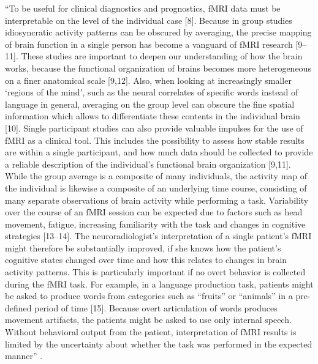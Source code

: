 ``To be useful for clinical diagnostics and prognostics, fMRI data must be
interpretable on the level of the individual case [8]. Because in group studies
idiosyncratic activity patterns can be obscured by averaging, the precise
mapping of brain function in a single person has become a vanguard of fMRI
research [9–11]. These studies are important to deepen our understanding of how
the brain works, because the functional organization of brains becomes more
heterogeneous on a finer anatomical scale [9,12]. Also, when looking at
increasingly smaller ‘regions of the mind’, such as the neural correlates of
specific words instead of language in general, averaging on the group level can
obscure the fine spatial information which allows to differentiate these
contents in the individual brain [10]. Single participant studies can also
provide valuable impulses for the use of fMRI as a clinical tool. This includes
the possibility to assess how stable results are within a single participant,
and how much data should be collected to provide a reliable description of the
individual’s functional brain organization [9,11]. While the group average is a
composite of many individuals, the activity map of the individual is likewise a
composite of an underlying time course, consisting of many separate
observations of brain activity while performing a task. Variability over the
course of an fMRI session can be expected due to factors such as head movement,
fatigue, increasing familiarity with the task and changes in cognitive
strategies [13–14]. The neuroradiologist’s interpretation of a single
patient’s fMRI might therefore be substantially improved, if she knows how the
patient’s cognitive states changed over time and how this relates to changes in
brain activity patterns. This is particularly important if no overt behavior
is collected during the fMRI task. For example, in a language production task,
patients might be asked to produce words from categories such as “fruits” or
“animals” in a pre- defined period of time [15]. Because overt articulation of
words produces movement artifacts, the patients might be asked to use only
internal speech. Without behavioral output from the patient, interpretation of
fMRI results is limited by the uncertainty about whether the task was performed
in the expected manner'' \citep{wegrzyn2018thought}.

